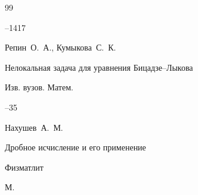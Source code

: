 \begin{thebibliography}{99}



--1417



















\by Репин~О.~А., Кумыкова~С.~К.

\paper Нелокальная задача для уравнения Бицадзе--Лыкова

\jour Изв. вузов. Матем.



--35
















\by Нахушев~А.~М.

\book Дробное исчисление и его применение


\publ Физматлит

\publaddr М.











\end{thebibliography}
